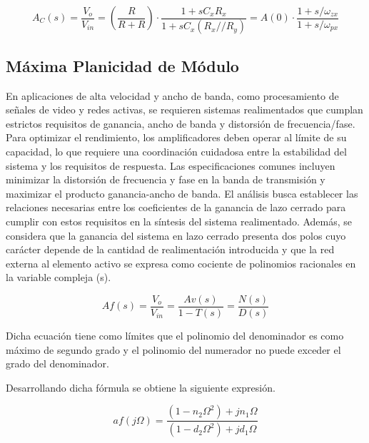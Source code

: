 \begin{equation}
    A_C (s) = \frac{V_o}{V_{in}} = \left( \frac{R}{R + R} \right) \cdot \frac{1 + sC_x R_x}{1 + sC_x (R_x // R_y)} = A(0) \cdot \frac{1 + s/\omega _{zx}}{1 + s/ \omega _{px}}
\end{equation}


\subsection{Máxima Planicidad de Módulo}

\hspace{1mm}En aplicaciones de alta velocidad y ancho de banda, como procesamiento de señales de video y redes activas, se requieren sistemas realimentados que cumplan estrictos requisitos de ganancia, ancho de banda y distorsión de frecuencia/fase. Para optimizar el rendimiento, los amplificadores deben operar al límite de su capacidad, lo que requiere una coordinación cuidadosa entre la estabilidad del sistema y los requisitos de respuesta. Las especificaciones comunes incluyen minimizar la distorsión de frecuencia y fase en la banda de transmisión y maximizar el producto ganancia-ancho de banda. El análisis busca establecer las relaciones necesarias entre los coeficientes de la ganancia de lazo cerrado para cumplir con estos requisitos en la síntesis del sistema realimentado. Además, se considera que la ganancia del sistema en lazo cerrado presenta dos polos cuyo carácter depende de la cantidad de realimentación introducida y que la red externa al elemento activo se expresa como cociente de polinomios racionales en la variable compleja (s).

\begin{equation}
    Af(s) =  \frac{V_o}{V_{in}} = \frac{Av (s)}{1 - T(s)} = \frac{N(s)}{D(s)}
\end{equation}

\bigskip
\hspace{1mm} Dicha ecuación tiene como límites que el polinomio del denominador es como máximo de segundo grado y el polinomio del numerador no puede exceder el grado del denominador.

\hspace{1mm} Desarrollando dicha fórmula se obtiene la siguiente expresión.

\begin{equation}
    af(j \Omega) = \frac{(1 - n_2 \Omega ^2) + jn_1 \Omega}{(1 - d_2 \Omega ^2) + jd_1 \Omega}
\end{equation}

